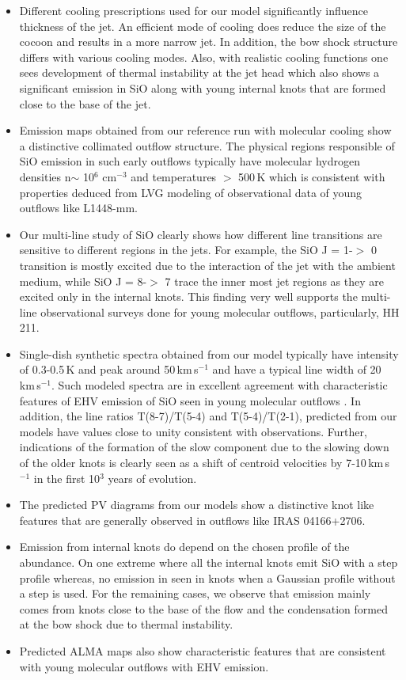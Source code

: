 \documentclass[useAMS,usenatbib]{mn2e}
\begin{document}
\begin{itemize}
\item Different cooling prescriptions used for our model
  significantly influence thickness of the jet. An
  efficient mode of cooling does reduce the size of the cocoon and results
  in a more narrow jet. In addition, the bow shock structure
  differs with various cooling modes. Also, with realistic cooling
  functions one sees development of
  thermal instability at the jet head which also shows a significant emission in SiO
  along with young internal knots that are formed close to the base of
  the jet.
\item Emission maps obtained from our reference run with molecular
  cooling show a distinctive collimated outflow structure. The
  physical regions responsible of SiO emission in such early outflows
  typically have molecular hydrogen densities n$\sim$ 10$^{6}$
  cm$^{-3}$ and temperatures $>$ 500\,K which is consistent with
  properties deduced from LVG modeling of observational data of
  young outflows like L1448-mm.
\item Our multi-line study of SiO clearly shows how different
  line transitions are sensitive to different regions in the jets. For
  example, the SiO J = 1-$>$ 0 transition is mostly excited due to
  the interaction of the jet with the ambient medium, while SiO J = 8-$>$ 7 trace the inner most jet regions as
  they are excited only in the internal knots. This finding very well
  supports the multi-line observational surveys done for young
  molecular outflows, particularly, HH 211.
\item Single-dish synthetic spectra obtained from our model typically
  have intensity of 0.3-0.5\,K and peak around 50\,km\,s$^{-1}$ and have a
  typical line width of 20\,km\,s$^{-1}$. Such modeled spectra are in
  excellent agreement with characteristic features of EHV emission of
  SiO seen in young molecular outflows . In addition, the line ratios 
  T(8-7)/T(5-4) and T(5-4)/T(2-1), predicted from our models have values close to
  unity consistent with observations. Further,
  indications of the formation of the slow component due to the
  slowing down of the
  older knots is clearly seen as a shift of centroid velocities by
  7-10\,km\,s$^{-1}$ in the first 10$^{3}$ years of evolution.
\item The predicted PV diagrams from our models show a distinctive
  knot like features that are generally observed in outflows like IRAS
  04166+2706.
\item Emission from internal knots do depend on the chosen profile of
  the abundance. On one extreme where all the internal knots emit SiO  
  with a step profile whereas, no emission in
  seen in knots when a Gaussian profile without a step is used. For
  the remaining cases, we observe that emission mainly
  comes from knots close to the base of the flow and the condensation
  formed at the bow shock due to thermal instability.
\item Predicted ALMA maps also show characteristic features that are
  consistent with young molecular outflows with EHV emission. 
\end{itemize}
\end{document}
